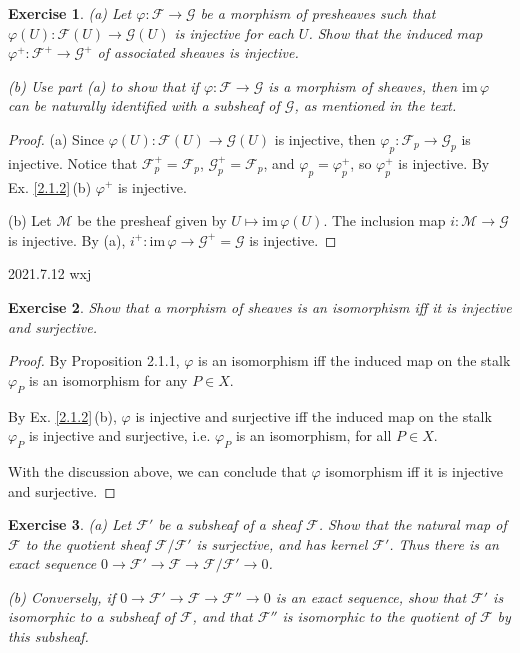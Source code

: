 \documentclass{amsart}
\newtheorem{exe}{Exercise}[subsection]
\theoremstyle{remark}\newtheorem{rmk}[theorem]{Remark}
\begin{document}
\begin{exe}
	\label{2.1.4}
    (a) Let $\varphi :\mathscr{F} \rightarrow  \mathscr{G} $ be a morphism of presheaves such that $\varphi(U) :\mathscr{F}(U) \rightarrow  \mathscr{G}(U) $
    is injective for each $U$. Show that the induced map $\varphi^+ :\mathscr{F}^+ \rightarrow  \mathscr{G}^+ $ of associated sheaves
    is injective.

    (b) Use part (a) to show that if $\varphi :\mathscr{F} \rightarrow  \mathscr{G} $ is a morphism of sheaves,
    then $\mathrm{im}\,\varphi$ can be naturally identified with a subsheaf of $ \mathscr{G}$, as mentioned in the text.
\end{exe}

\begin{proof}
    (a) Since $\varphi(U) :\mathscr{F}(U) \rightarrow  \mathscr{G}(U) $ is injective, then $\varphi_p :\mathscr{F}_p \rightarrow  \mathscr{G}_p $ is injective.
    Notice that $\mathscr{F}_p^+=\mathscr{F}_p$, $\mathscr{G}_p^+=\mathscr{F}_p$, and $\varphi_p=\varphi_p^+$, so $\varphi_p^+$ is injective.
    By Ex. \ref{2.1.2}\,(b) $\varphi^+$ is injective.

    (b) Let $\mathscr{M}$ be the presheaf given by $U\mapsto\mathrm{im}\,\varphi(U)$. The inclusion map $i: \mathscr{M} \rightarrow  \mathscr{G}$ is injective. By (a), $i^+:\mathrm{im}\,\varphi \rightarrow  \mathscr{G}^+=\mathscr{G}$
    is injective.
\end{proof}    

2021.7.12 wxj
\begin{exe}
	\label{2.1.5}
   Show that a morphism of sheaves is an isomorphism iff it is injective and surjective.
\end{exe}

\begin{proof}
   By Proposition 2.1.1, $\varphi$ is an isomorphism iff the induced map on the stalk $\varphi_{P}$ is an isomorphism for any $P \in X$. 
   
   By Ex. \ref{2.1.2}\,(b), $\varphi$ is injective and surjective iff the induced map on the stalk $\varphi_{P}$ is injective and surjective, i.e. $\varphi_P$ is an isomorphism, for all $P \in X$.
   
   With the discussion above, we can conclude that $\varphi$ isomorphism iff it is injective and surjective.
\end{proof}

\begin{exe}
   (a) Let $\mathscr{F}'$ be a subsheaf of a sheaf $\mathscr{F}$. Show that the natural map of $\mathscr{F}$ to the quotient sheaf $\mathscr{F}/\mathscr{F}'$ is surjective, and has kernel $\mathscr{F}'$. Thus there is an exact sequence $0 \rightarrow \mathscr{F}' \rightarrow \mathscr{F} \rightarrow \mathscr{F}/\mathscr{F}' \rightarrow 0$.
   
   (b) Conversely, if $0 \rightarrow \mathscr{F}' \rightarrow \mathscr{F} \rightarrow \mathscr{F}'' \rightarrow 0$ is an exact sequence, show that $\mathscr{F}'$ is isomorphic to a subsheaf of $\mathscr{F}$, and that $\mathscr{F}''$ is isomorphic to the quotient of $\mathscr{F}$ by this subsheaf.
\end{exe}
\end{document}
